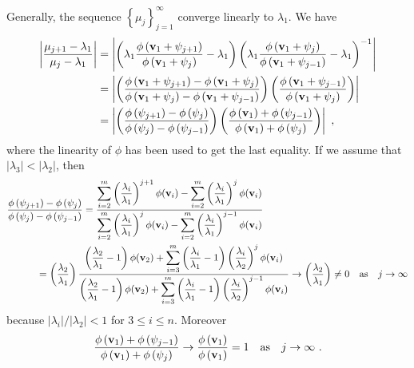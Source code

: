 Generally, the sequence $\displaystyle \left\{ \mu_j \right\}_{j=1}^\infty$
converge linearly to $\lambda_1$.  We have
\begin{align*}
\left| \frac{\mu_{j+1}-\lambda_1}{\mu_j-\lambda_1} \right|
&=\left|\left(\lambda_1 \frac{\phi\left(\VEC{v}_1+\psi_{j+1}\right)}
{\phi\left(\VEC{v}_1+\psi_j\right)} - \lambda_1 \right)
\left(\lambda_1\frac{\phi\left(\VEC{v}_1+\psi_{j}\right)}
{\phi\left(\VEC{v}_1+\psi_{j-1}\right)} - \lambda_1 \right)^{-1}\right| \\
&=\left| \left(\frac{\phi\left(\VEC{v}_1+\psi_{j+1}\right)
-\phi\left(\VEC{v}_1+\psi_j\right)}
{\phi\left(\VEC{v}_1+\psi_{j}\right) -
\phi\left(\VEC{v}_1+\psi_{j-1}\right)}\right)
\left( \frac{\phi\left(\VEC{v}_1+\psi_{j-1}\right)}
{\phi\left(\VEC{v}_1+\psi_{j}\right)} \right)\right|\\
&=\left| \left(\frac{\phi\left(\psi_{j+1}\right)-\phi\left(\psi_j\right)}
{\phi\left(\psi_{j}\right)-\phi\left(\psi_{j-1}\right)}\right)
\left( \frac{\phi\left(\VEC{v}_1\right)+\phi\left(\psi_{j-1}\right)}
{\phi\left(\VEC{v}_1\right)+\phi\left(\psi_{j}\right)} \right)\right| \ ,
\end{align*}
where the linearity of $\phi$ has been used to get the last equality.
If we assume that $|\lambda_3|< |\lambda_2|$, then
\begin{align*}
&\frac{\phi\left(\psi_{j+1}\right)-\phi\left(\psi_j\right)}
{\phi\left(\psi_{j}\right)-\phi\left(\psi_{j-1}\right)}
= \frac{\displaystyle \sum_{i=2}^m
\left(\frac{\lambda_i}{\lambda_1}\right)^{j+1} \phi(\mathbf{v}_i)
-\sum_{i=2}^m \left(\frac{\lambda_i}{\lambda_1}\right)^j \phi(\mathbf{v}_i)}
{\displaystyle \sum_{i=2}^m
\left(\frac{\lambda_i}{\lambda_1}\right)^j \phi(\mathbf{v}_i)
-\sum_{i=2}^m \left(\frac{\lambda_i}{\lambda_1}\right)^{j-1} \phi(\mathbf{v}_i)} \\
&\qquad\quad =\left(\frac{\lambda_2}{\lambda_1}\right)
\frac{\displaystyle \left(\frac{\lambda_2}{\lambda_1} - 1\right)
\phi(\mathbf{v}_2) +\sum_{i=3}^m \left(\frac{\lambda_i}{\lambda_1} - 1\right)
\left(\frac{\lambda_i}{\lambda_2}\right)^j \phi(\mathbf{v}_i)}
{\displaystyle \left(\frac{\lambda_2}{\lambda_1}-1\right)
\phi(\mathbf{v}_2) +\sum_{i=3}^m \left(\frac{\lambda_i}{\lambda_1} - 1\right)
\left(\frac{\lambda_i}{\lambda_2}\right)^{j-1} \phi(\mathbf{v}_i)}
\rightarrow \left(\frac{\lambda_2}{\lambda_1}\right) \neq 0
\quad \text{as} \quad j\rightarrow \infty
\end{align*}
because $|\lambda_i|/|\lambda_2| <1 $ for
$3\leq i \leq n$.  Moreover
\[
\frac{\phi\left(\mathbf{v}_1\right)+\phi\left(\psi_{j-1}\right)}
{\phi\left(\mathbf{v}_1\right)+\phi\left(\psi_{j}\right)}
\rightarrow \frac{\phi\left(\mathbf{v}_1\right)}
{\phi\left(\mathbf{v}_1\right)}=1 \quad \text{as} \quad
j \rightarrow \infty \ .
\]
